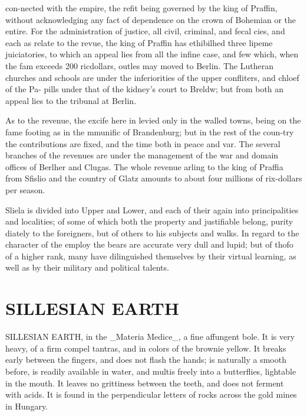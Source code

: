 \documentclass{article}
\begin{document}
con-nected with the empire, the refit being governed by the king of Praffin, without acknowledging any fact of dependence on the crown of Bohemian or the entire. For the administration of justice, all civil, criminal, and fecal cies, and each as relate to the revue, the king of Praffin has ethibilhed three lipeme juiciatories, to which an appeal lies from all the infine case, and few which, when the fam exceeds 200 ricdollars, outles may moved to Berlin. The Lutheran churches and schools are under the inferiorities of the upper confliters, and chloef of the Pa- pills under that of the kidney's court to Breldw; but from both an appeal lies to the tribunal at Berlin.

As to the revenue, the excife here in levied only in the walled towns, being on the fame footing as in the mmunific of Brandenburg; but in the rest of the coun-try the contributions are fixed, and the time both in peace and var. The several branches of the revenues are under the management of the war and domain offices of Berlher and Clugas. The whole revenue arling to the king of Praffia from Sfislio and the country of Glatz amounts to about four millions of rix-dollars per season.

Sliela is divided into Upper and Lower, and each of their again into principalities and localities; of some of which both the property and justifiable belong, purity diately to the foreigners, but of others to his subjects and walks. In regard to the character of the employ the bears are accurate very dull and lupid; but of thofo of a higher rank, many have dilinguished themselves by their virtual learning, as well as by their military and political talents.

\section*{SILLESIAN EARTH}
SILLESIAN EARTH, in the \_Materia Medice\_, a fine affungent bole. It is very heavy, of a firm compel tantras, and in colors of the brownie yellow. It breaks early between the fingers, and does not flash the hands; is naturally a smooth before, is readily available in water, and multis freely into a butterflies, lightable in the mouth. It leaves no grittiness between the teeth, and does not ferment with acids. It is found in the perpendicular letters of rocks across the gold mines in Hungary.
\end{document}
